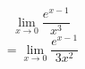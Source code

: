 \documentclass{article}
\begin{document}

        $$\lim_{x\to0} \frac{e^{x-1}}{x^3}$$
        $$ = \lim_{x\to0} \frac{e^{x-1}}{3x^2}$$
    
\end{document}
